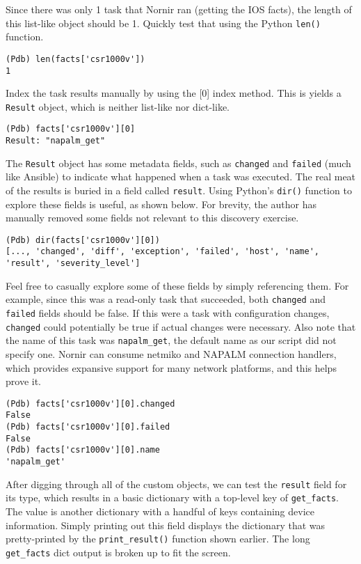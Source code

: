 Since there was only 1 task that Nornir ran (getting the IOS facts), the
length of this list-like object should be 1. Quickly test that using the
Python \verb|len()| function.

\begin{verbatim}
(Pdb) len(facts['csr1000v'])
1
\end{verbatim}

Index the task results manually by using the [0] index method. This is yields
a \verb|Result| object, which is neither list-like nor dict-like.

\begin{verbatim}
(Pdb) facts['csr1000v'][0]
Result: "napalm_get"
\end{verbatim}

The \verb|Result| object has some metadata fields, such as \verb|changed| and
\verb|failed| (much like Ansible) to indicate what happened when a task was
executed. The real meat of the results is buried in a field called
\verb|result|. Using Python's \verb|dir()| function to explore these fields is
useful, as shown below. For brevity, the author has manually removed some
fields not relevant to this discovery exercise.

\begin{verbatim}
(Pdb) dir(facts['csr1000v'][0])
[..., 'changed', 'diff', 'exception', 'failed', 'host', 'name', 'result', 'severity_level']
\end{verbatim}

Feel free to casually explore some of these fields by simply referencing them.
For example, since this was a read-only task that succeeded, both
\verb|changed| and \verb|failed| fields should be false. If this were a task
with configuration changes, \verb|changed| could potentially be true if actual
changes were necessary. Also note that the name of this task was
\verb|napalm_get|, the default name as our script did not specify one. Nornir
can consume netmiko and NAPALM connection handlers, which provides expansive
support for many network platforms, and this helps prove it.

\begin{verbatim}
(Pdb) facts['csr1000v'][0].changed
False
(Pdb) facts['csr1000v'][0].failed
False
(Pdb) facts['csr1000v'][0].name
'napalm_get'
\end{verbatim}

After digging through all of the custom objects, we can test the \verb|result|
field for its type, which results in a basic dictionary with a top-level key
of \verb|get_facts|. The value is another dictionary with a handful of keys
containing device information. Simply printing out this field displays the
dictionary that was pretty-printed by the \verb|print_result()| function shown earlier.
The long \verb|get_facts| dict output is broken up to fit the screen.

